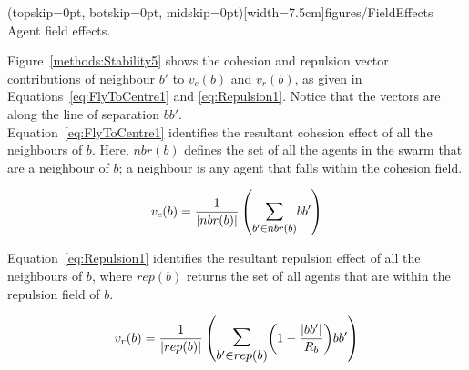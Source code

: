 \documentclass{ieeeaccess}
\begin{document}
\Figure[t!](topskip=0pt, botskip=0pt, midskip=0pt)[width=7.5cm]{figures/FieldEffects}
{Agent field effects.\label{methods:FieldEffects}}


Figure~\ref{methods:Stability5} shows the cohesion and repulsion vector
contributions of neighbour $b'$ to $v_c(b)$ and $v_r(b)$, as given in
Equations~\ref{eq:FlyToCentre1} and \ref{eq:Repulsion1}. Notice that the vectors
are along the line of separation $bb'$. \\


Equation~\ref{eq:FlyToCentre1} identifies the resultant cohesion effect of all
the neighbours of $b$. Here, $nbr(b)$ defines the set of all the agents in the
swarm that are a neighbour of $b$; a neighbour is any agent that falls within
the cohesion field.

\begin{equation}\label{eq:FlyToCentre1}
v_{c}(b) = \frac{1}{|nbr(b)|}\left({\mathlarger{\sum_{b' \in nbr(b)}}{bb'}}\right)
\end{equation}

Equation~\ref{eq:Repulsion1} identifies the resultant repulsion effect of all
the neighbours of $b$, where $rep(b)$ returns the set of all agents that are
within the repulsion field of $b$.

\begin{equation}
\label{eq:Repulsion1}
v_{r}(b) = 
\frac{1}{|rep(b)|}
\left(
\mathlarger{\mathlarger{\sum_{b' \in rep(b)}}}
{\left( 1-\frac{|bb'|}{R_b} \right)}
{bb'}
\right)
\end{equation}
\end{document}
